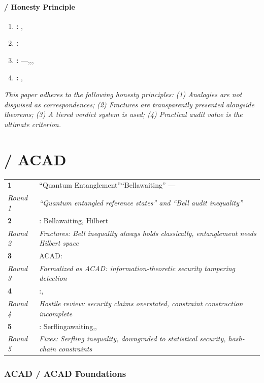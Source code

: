 \documentclass[11pt,a4paper]{article}
\theoremstyle{plain}
\theoremstyle{definition}
\theoremstyle{remark}
\begin{document}
{\subsection{ / Honesty Principle}
\begin{enumerate}[leftmargin=*]
 \item \textbf{: }, 
 \item \textbf{: } 
 \item \textbf{: } ---,,, 
 \item \textbf{: }, 
\end{enumerate}
\textit{This paper adheres to the following honesty principles: (1) Analogies are not disguised as correspondences; (2) Fractures are transparently presented alongside theorems; (3) A tiered verdict system is used; (4) Practical audit value is the ultimate criterion.}
\newpage
\part{ / ACAD}
\label{part:acad}
\begin{scxbox}
\begin{tabular}{p{3cm} p{11cm}}
\textbf{1} & ``Quantum Entanglement''``Bellawaiting'' --- \\
\textit{Round 1} & \textit{``Quantum entangled reference states'' and ``Bell audit inequality''} \\
\textbf{2} & : Bellawaiting, Hilbert \\
\textit{Round 2} & \textit{Fractures: Bell inequality always holds classically, entanglement needs Hilbert space} \\
\textbf{3} & ACAD: \\
\textit{Round 3} & \textit{Formalized as ACAD: information-theoretic security tampering detection} \\
\textbf{4} & :, \\
\textit{Round 4} & \textit{Hostile review: security claims overstated, constraint construction incomplete} \\
\textbf{5} & : Serflingawaiting,, \\
\textit{Round 5} & \textit{Fixes: Serfling inequality, downgraded to statistical security, hash-chain constraints} \\
\end{tabular}
\end{scxbox}
\section{ACAD / ACAD Foundations}
\label{sec:acad-found}
}
\end{document}

